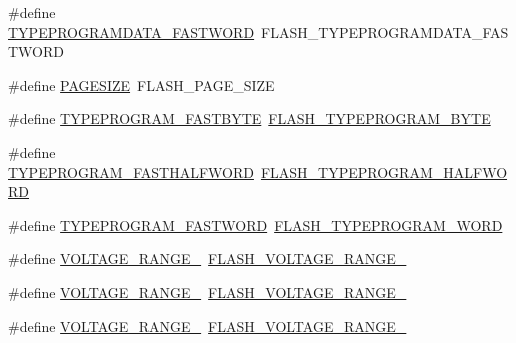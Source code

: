 \begin{DoxyCompactItemize}
\item 
\#define \hyperlink{group___h_a_l___f_l_a_s_h___aliased___defines_ga871de63c00336d70644a300bc2a67f01}{T\+Y\+P\+E\+P\+R\+O\+G\+R\+A\+M\+D\+A\+T\+A\+\_\+\+F\+A\+S\+T\+W\+O\+RD}~F\+L\+A\+S\+H\+\_\+\+T\+Y\+P\+E\+P\+R\+O\+G\+R\+A\+M\+D\+A\+T\+A\+\_\+\+F\+A\+S\+T\+W\+O\+RD
\item 
\#define \hyperlink{group___h_a_l___f_l_a_s_h___aliased___defines_ga519adc2af3ba06a8f0548b6690050a89}{P\+A\+G\+E\+S\+I\+ZE}~F\+L\+A\+S\+H\+\_\+\+P\+A\+G\+E\+\_\+\+S\+I\+ZE
\item 
\#define \hyperlink{group___h_a_l___f_l_a_s_h___aliased___defines_ga07e4cba7de4bf96cfafa957245f9d06d}{T\+Y\+P\+E\+P\+R\+O\+G\+R\+A\+M\+\_\+\+F\+A\+S\+T\+B\+Y\+TE}~\hyperlink{group___f_l_a_s_h___type___program_gac975d7139325057ed0069c6b55e4faed}{F\+L\+A\+S\+H\+\_\+\+T\+Y\+P\+E\+P\+R\+O\+G\+R\+A\+M\+\_\+\+B\+Y\+TE}
\item 
\#define \hyperlink{group___h_a_l___f_l_a_s_h___aliased___defines_gad562e3d208ce464a19d5ec356e7f21ff}{T\+Y\+P\+E\+P\+R\+O\+G\+R\+A\+M\+\_\+\+F\+A\+S\+T\+H\+A\+L\+F\+W\+O\+RD}~\hyperlink{group___f_l_a_s_h___type___program_ga2b607dfc2efd463a8530e327bc755582}{F\+L\+A\+S\+H\+\_\+\+T\+Y\+P\+E\+P\+R\+O\+G\+R\+A\+M\+\_\+\+H\+A\+L\+F\+W\+O\+RD}
\item 
\#define \hyperlink{group___h_a_l___f_l_a_s_h___aliased___defines_ga1c170a7eba13377a1922bf6750b1f0ce}{T\+Y\+P\+E\+P\+R\+O\+G\+R\+A\+M\+\_\+\+F\+A\+S\+T\+W\+O\+RD}~\hyperlink{group___f_l_a_s_h___type___program_gadd25c6821539030ba6711e7c0d586c3e}{F\+L\+A\+S\+H\+\_\+\+T\+Y\+P\+E\+P\+R\+O\+G\+R\+A\+M\+\_\+\+W\+O\+RD}
\item 
\#define \hyperlink{group___h_a_l___f_l_a_s_h___aliased___defines_ga5a1b1ceafccd5ab37c7cfbebc9527329}{V\+O\+L\+T\+A\+G\+E\+\_\+\+R\+A\+N\+G\+E\+\_}~\hyperlink{group___f_l_a_s_h_ex___voltage___range_ga5cadf49a63c968cde3b980e5139d398e}{F\+L\+A\+S\+H\+\_\+\+V\+O\+L\+T\+A\+G\+E\+\_\+\+R\+A\+N\+G\+E\+\_}
\item 
\#define \hyperlink{group___h_a_l___f_l_a_s_h___aliased___defines_ga1c0639cea187d17c4dad607fe124a94f}{V\+O\+L\+T\+A\+G\+E\+\_\+\+R\+A\+N\+G\+E\+\_}~\hyperlink{group___f_l_a_s_h_ex___voltage___range_gad047be2bc7aa9be946b5b0c6b3062ef3}{F\+L\+A\+S\+H\+\_\+\+V\+O\+L\+T\+A\+G\+E\+\_\+\+R\+A\+N\+G\+E\+\_}
\item 
\#define \hyperlink{group___h_a_l___f_l_a_s_h___aliased___defines_ga45c6cc06a75f9dfd18e3d182cbe1387b}{V\+O\+L\+T\+A\+G\+E\+\_\+\+R\+A\+N\+G\+E\+\_}~\hyperlink{group___f_l_a_s_h_ex___voltage___range_ga50950407a789684eec9216f49e0831a0}{F\+L\+A\+S\+H\+\_\+\+V\+O\+L\+T\+A\+G\+E\+\_\+\+R\+A\+N\+G\+E\+\_}

\end{DoxyCompactItemize}
